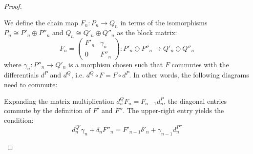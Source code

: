 \begin{proof}
\begin{enumerate}
\begin{enumerate}
        \medskip
        We define the chain map $F_n: P_n \to Q_n$ in terms of the isomorphisms $P_n \cong P'_n \oplus P''_n$ and $Q_n \cong Q'_n \oplus Q''_n$ as the block matrix:
        $$
        F_n = \begin{pmatrix} 
        F'_n & \gamma_n \\ 
        0 & F''_n 
        \end{pmatrix} : P'_n \oplus P''_n \to Q'_n \oplus Q''_n
        $$
        where $\gamma_n: P''_n \to Q'_n$ is a morphism chosen such that $F$ commutes with the differentials $d^P$ and $d^Q$, i.e. $d^Q \circ F = F \circ d^P$. In other words, the following diagrams need to commute:
        \begin{center}
        \end{center}


        \medskip
        Expanding the matrix multiplication $d^Q_n F_n = F_{n-1} d^P_n$, the diagonal entries commute by the definition of $F'$ and $F''$. The upper-right entry yields the condition:
        \begin{equation} \label{eq:gamma_condition}
        d^{Q'}_n \gamma_n + \delta_n F''_n = F'_{n-1} \delta'_n + \gamma_{n-1} d^{P''}_n
        \end{equation}



\end{enumerate}
\end{enumerate}
\end{proof}

